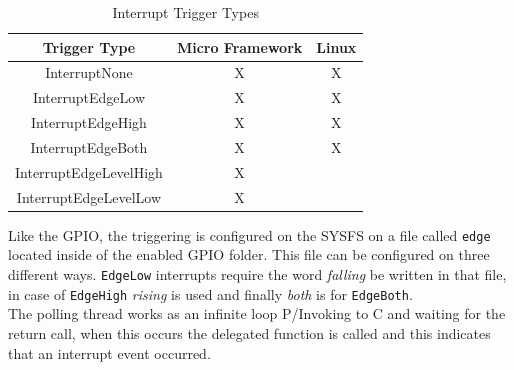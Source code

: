 \begin{table}[htb]
\begin{center}
\begin{tabular}{|c|c|c|}
\hline
{\bf Trigger Type} & {\bf Micro Framework} & {\bf Linux}  \\ \hline \hline
InterruptNone        & X    & X       \\ \hline
InterruptEdgeLow        & X    & X       \\ \hline
InterruptEdgeHigh        & X    & X       \\ \hline
InterruptEdgeBoth        & X    & X       \\ \hline
InterruptEdgeLevelHigh        & X    &        \\ \hline
InterruptEdgeLevelLow        & X    &        \\ \hline
\end{tabular}
\caption{Interrupt Trigger Types}
\label{T:Interrupt-Trigger-Types}
\end{center}
\end{table}

Like the GPIO, the triggering is configured on the SYSFS on a file called \verb!edge! located inside of the enabled GPIO folder. This file can be configured on three different ways. \verb!EdgeLow! interrupts require the word \textit{falling} be written in that file, in case of \verb!EdgeHigh! \textit{rising} is used and finally \textit{both} is for \verb!EdgeBoth!.
\\
The polling thread works as an infinite loop P/Invoking to C and waiting for the return call, when this occurs the delegated function is called and this indicates that an interrupt event occurred.

